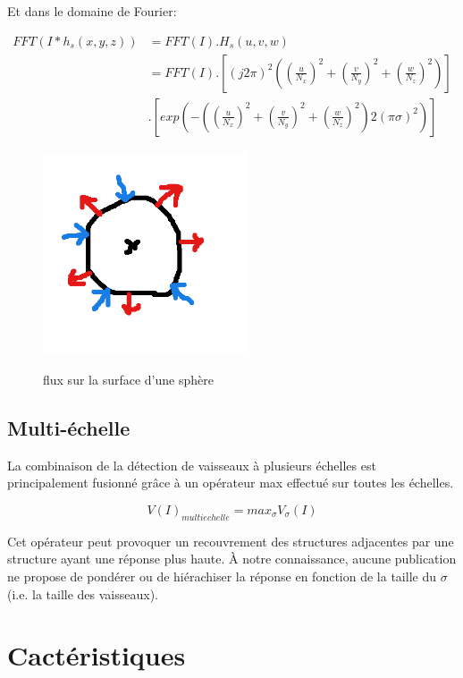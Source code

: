   Et dans le domaine de Fourier:
  
  \begin{align}
    FFT( I * h_s(x,y,z) ) &= FFT(I) . H_s(u,v,w) \\
                         &= FFT(I) . [ (j2 \pi)^2 ( (\frac{u}{N_x})^2 + (\frac{v}{N_y})^2 + (\frac{w}{N_z})^2 ) ] \\
                         & . [ exp( -( (\frac{u}{N_x})^2 + (\frac{v}{N_y})^2 + (\frac{w}{N_z})^2 ) 2(\pi\sigma)^2 ) ]
  \end{align}
  
  \begin{figure}[h]
    \centering
    \includegraphics[height=6cm]{Images/flux.png}
    \label{fig:flux_sphere}
    \caption{flux sur la surface d'une sphère}
  \end{figure}
  
  \subsection{Multi-échelle}
  \label{sec:EA:rehaussement:echelle:multiScale}
  

  La combinaison de la détection de vaisseaux à plusieurs échelles est principalement fusionné grâce à un opérateur max effectué sur toutes les échelles.
  
  \begin{equation}
    V(I)_{multi echelle} = max_{\sigma}V_{\sigma}(I)
  \end{equation}
  
  Cet opérateur peut provoquer un recouvrement des structures adjacentes par une structure ayant une réponse plus haute. À notre connaissance, aucune publication ne propose de pondérer ou de hiérachiser la réponse en fonction de la taille du $\sigma$ (i.e. la taille des vaisseaux).


\section{Cactéristiques}


